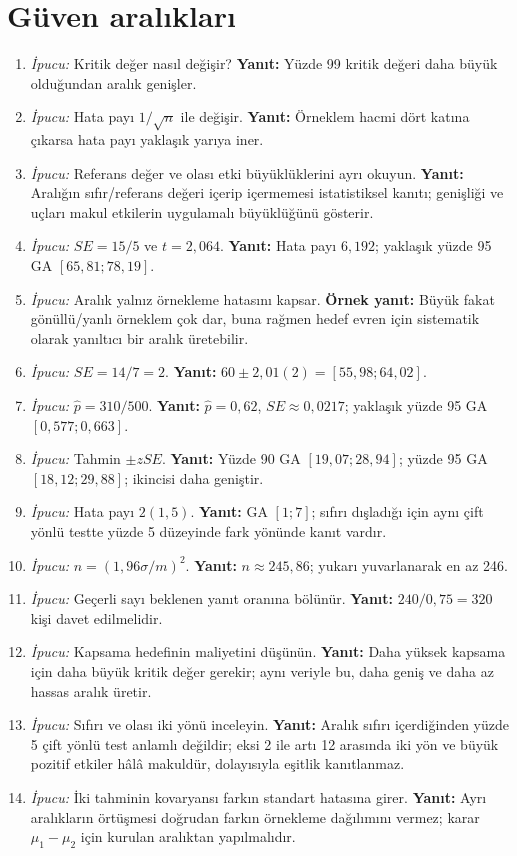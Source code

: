 \section{Güven aralıkları}

\begin{enumerate}[leftmargin=*,itemsep=5pt]
\item \emph{İpucu:} Kritik değer nasıl değişir?
\textbf{Yanıt:} Yüzde 99 kritik değeri daha büyük olduğundan aralık genişler.
\item \emph{İpucu:} Hata payı $1/\sqrt n$ ile değişir.
\textbf{Yanıt:} Örneklem hacmi dört katına çıkarsa hata payı yaklaşık yarıya iner.
\item \emph{İpucu:} Referans değer ve olası etki büyüklüklerini ayrı okuyun.
\textbf{Yanıt:} Aralığın sıfır/referans değeri içerip içermemesi istatistiksel
kanıtı; genişliği ve uçları makul etkilerin uygulamalı büyüklüğünü gösterir.
\item \emph{İpucu:} $SE=15/5$ ve $t=2{,}064$.
\textbf{Yanıt:} Hata payı $6{,}192$; yaklaşık yüzde 95 GA
$[65{,}81;78{,}19]$.
\item \emph{İpucu:} Aralık yalnız örnekleme hatasını kapsar.
\textbf{Örnek yanıt:} Büyük fakat gönüllü/yanlı örneklem çok dar, buna rağmen
hedef evren için sistematik olarak yanıltıcı bir aralık üretebilir.
\item \emph{İpucu:} $SE=14/7=2$.
\textbf{Yanıt:} $60\pm2{,}01(2)=[55{,}98;64{,}02]$.
\item \emph{İpucu:} $\hat p=310/500$.
\textbf{Yanıt:} $\hat p=0{,}62$, $SE\approx0{,}0217$; yaklaşık yüzde 95 GA
$[0{,}577;0{,}663]$.
\item \emph{İpucu:} Tahmin $\pm zSE$.
\textbf{Yanıt:} Yüzde 90 GA $[19{,}07;28{,}94]$; yüzde 95 GA
$[18{,}12;29{,}88]$; ikincisi daha geniştir.
\item \emph{İpucu:} Hata payı $2(1{,}5)$.
\textbf{Yanıt:} GA $[1;7]$; sıfırı dışladığı için aynı çift yönlü testte
yüzde 5 düzeyinde fark yönünde kanıt vardır.
\item \emph{İpucu:} $n=(1{,}96\sigma/m)^2$.
\textbf{Yanıt:} $n\approx245{,}86$; yukarı yuvarlanarak en az 246.
\item \emph{İpucu:} Geçerli sayı beklenen yanıt oranına bölünür.
\textbf{Yanıt:} $240/0{,}75=320$ kişi davet edilmelidir.
\item \emph{İpucu:} Kapsama hedefinin maliyetini düşünün.
\textbf{Yanıt:} Daha yüksek kapsama için daha büyük kritik değer gerekir;
aynı veriyle bu, daha geniş ve daha az hassas aralık üretir.
\item \emph{İpucu:} Sıfırı ve olası iki yönü inceleyin.
\textbf{Yanıt:} Aralık sıfırı içerdiğinden yüzde 5 çift yönlü test anlamlı
değildir; eksi 2 ile artı 12 arasında iki yön ve büyük pozitif etkiler hâlâ
makuldür, dolayısıyla eşitlik kanıtlanmaz.
\item \emph{İpucu:} İki tahminin kovaryansı farkın standart hatasına girer.
\textbf{Yanıt:} Ayrı aralıkların örtüşmesi doğrudan farkın örnekleme
dağılımını vermez; karar $\mu_1-\mu_2$ için kurulan aralıktan yapılmalıdır.
\end{enumerate}

